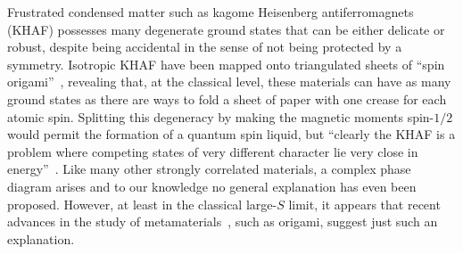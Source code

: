 \documentclass[a4paper,aps,prl,twocolumn,floatfix,showpacs,superscriptaddress]{revtex4-1}
\begin{document}
\noindent
\label{intro}
Frustrated condensed matter such as kagome Heisenberg antiferromagnets (KHAF) possesses many degenerate ground states that can be either delicate or robust, despite being accidental in the sense of not being protected by a symmetry.
Isotropic KHAF have been mapped onto triangulated sheets of ``spin origami''~\cite{shender1993kagome,chandra1993anisotropic, Ritchey1993spin},
revealing that, at the classical level, these materials can have as many ground states as there are ways to fold a sheet of paper with one crease for each atomic spin. 
Splitting this degeneracy by making the magnetic moments spin-$1/2$ would permit the formation of a quantum spin liquid\cite{yan2011spin}, 
but ``clearly the KHAF is a problem where competing states of very different character lie very close in energy''~\cite{liao2017gapless}. Like many other strongly correlated materials, a complex phase diagram arises and to our knowledge no general explanation has even been proposed. However, at least in the classical large-$S$ limit, it appears that recent advances in the study of metamaterials~\cite{sun2012surface, babaee20133d,  schenk2013geometry, wei2013geometric, kane2014topological, shan2014harnessing, paulose2015selective, rocklin2015transformable, lubensky2015phonons, rocklin2016mechanical, abbaszadeh2016sonic, chen2016topological}, such as origami, suggest just such an explanation. 
\end{document}
